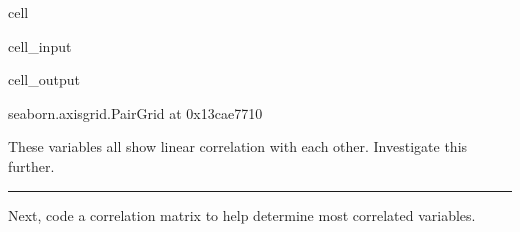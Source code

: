 \documentclass[letterpaper,10pt,english]{sphinxmanual}
\begin{document}
\begin{sphinxuseclass}{cell}
\begin{sphinxuseclass}{cell_input}
\begin{sphinxVerbatim}[commandchars=\\\{\}]
\PYG{p}{[}\PYG{p}{[}    \PYG{p}{]}\PYG{p}{]}   
\end{sphinxVerbatim}

\end{sphinxuseclass}
\begin{sphinxuseclass}{cell_output}
\begin{sphinxVerbatim}[commandchars=\\\{\}]
\PYGZlt{}seaborn.axisgrid.PairGrid at 0x13cae7710\PYGZgt{}
\end{sphinxVerbatim}

\noindent{}

\end{sphinxuseclass}
\end{sphinxuseclass}
\sphinxAtStartPar
These variables all show linear correlation with each other. Investigate this further.


\bigskip\hrule\bigskip


\sphinxAtStartPar
{}

\sphinxAtStartPar
Next, code a correlation matrix to help determine most correlated variables.
\end{document}
